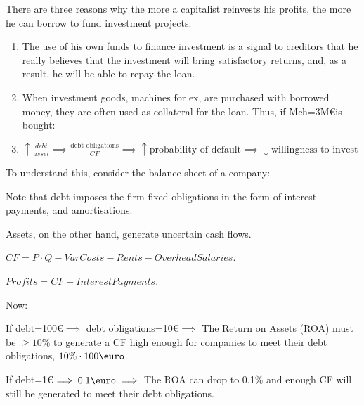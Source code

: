 \documentclass{report}
\begin{document}
There are three reasons why the more a capitalist reinvests his profits, the more he can borrow to fund investment projects: 
\begin{enumerate}
    \item The use of his own funds to finance investment is a signal to creditors that he really believes that the investment will bring satisfactory returns, and, as a result, he will be able to repay the loan. 
    \item When investment goods, machines for ex, are purchased with borrowed money, they are often used as collateral for the loan. Thus, if Mch=3M\euro is bought: 
    \item $\uparrow \frac{debt}{asset}\implies \frac{\text{debt obligations}}{CF}\implies \uparrow \text{probability of default} \implies \downarrow \text{willingness to invest}$
\end{enumerate}

To understand this, consider the balance sheet of a company:


Note that debt imposes the firm fixed obligations in the form of interest payments, and amortisations. 

Assets, on the other hand, generate uncertain cash flows.

$CF=P\cdot Q-VarCosts-Rents-OverheadSalaries$.

$Profits=CF-InterestPayments$.

Now: 
\begin{description}
    \item If debt=100\euro $\implies$ debt obligations=10\euro $\implies$ The Return on Assets (ROA) must be $\geq 10\%$ to generate a CF high enough for companies to meet their debt obligations, $10\%\cdot100\text{\euro}$. 
    \item If debt=1\euro $\implies 0.1\text{\euro} \implies$ The ROA can drop to 0.1\% and enough CF will still be generated to meet their debt obligations. 
\end{description}
\end{document}
